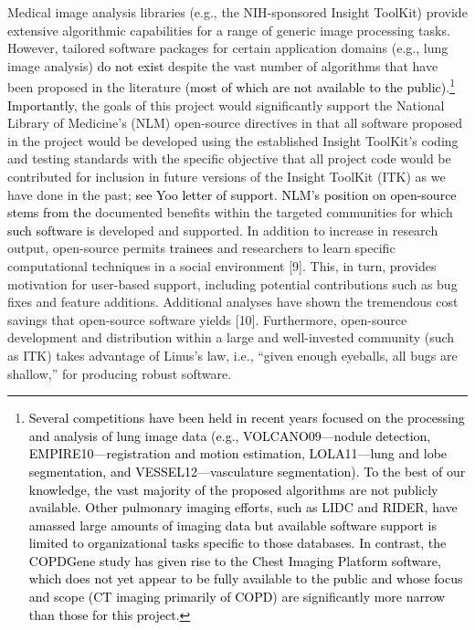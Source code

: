 \documentclass[11pt,]{article}
\let\rmarkdownfootnote\footnote%
\def\footnote{\protect\rmarkdownfootnote}
\begin{document}
Medical image analysis libraries (e.g., the NIH-sponsored Insight
ToolKit) provide extensive algorithmic capabilities for a range of
generic image processing tasks. However, tailored software packages for
certain application domains (e.g., lung image analysis)
\textcolor{black}{do not exist} despite the vast number of algorithms
that have been proposed in the literature
\textcolor{black}{(most of which are not available to the public)}.\footnote{\textcolor{black}{Several competitions have been held in recent years focused on the processing and
  analysis of lung image data (e.g., VOLCANO09---nodule detection, EMPIRE10---registration and motion estimation,
  LOLA11---lung and lobe segmentation, and VESSEL12---vasculature segmentation).  To the best of our knowledge, the vast majority of
  the proposed algorithms are not publicly available.  Other pulmonary imaging efforts, such as LIDC
  and RIDER, have amassed large amounts of imaging data but available software support is limited to organizational
  tasks specific to those databases. In contrast, the COPDGene study has given rise to the Chest Imaging Platform
  software, which does not yet appear to be fully available to the public and whose focus and scope (CT imaging
  primarily of COPD) are significantly more narrow than those for this project.}}
\textcolor{black}{Importantly}, the goals of this project would
significantly support the National Library of Medicine's (NLM)
open-source directives in that all software proposed in the project
would be developed using the established Insight ToolKit's coding and
testing standards with the specific objective that all project code
would be contributed for inclusion in future versions of the Insight
ToolKit (ITK) as we have done in the past;
\textcolor{black}{see Yoo letter of support}.
\textcolor{black}{NLM's position on open-source stems from the}
documented benefits within the targeted communities for which
\textcolor{black}{such software} is developed and supported. In addition
to increase in research output, open-source permits
\textcolor{black}{trainees} and researchers to learn specific
computational techniques in a social environment {[}9{]}. This, in turn,
provides motivation for user-based support, including potential
contributions such as bug fixes and feature additions. Additional
analyses have shown the tremendous cost savings that open-source
software yields {[}10{]}. Furthermore, open-source development and
distribution within a large and well-invested community (such as ITK)
takes advantage of Linus's law, i.e., ``given enough eyeballs, all bugs
are shallow,'' for producing robust software.
\end{document}
